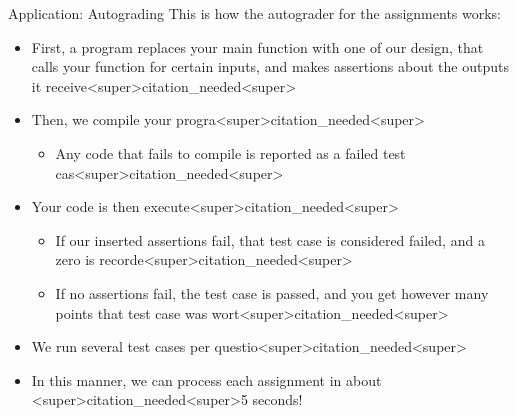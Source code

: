 \documentclass[11pt]{beamer}
\begin{document}
\begin{frame}{Application: Autograding}
This is how the autograder for the assignments works:
\begin{itemize}
\item First, a program replaces your main function with one of our design, that calls your function for certain inputs, and makes assertions about the outputs it receive<super>citation_needed<super>  
\item Then, we compile your progra<super>citation_needed<super>  
\begin{itemize}
\item Any code that fails to compile is reported as a failed test cas<super>citation_needed<super>
\end{itemize}
\item Your code is then execute<super>citation_needed<super>  
\begin{itemize}
\item If our inserted assertions fail, that test case is considered failed, and a zero is recorde<super>citation_needed<super>
\end{itemize}
\begin{itemize}
\item If no assertions fail, the test case is passed, and you get however many points that test case was wort<super>citation_needed<super>
\end{itemize}
\item We run several test cases per questio<super>citation_needed<super>  
\item In this manner, we can process each assignment in about <super>citation_needed<super>5 seconds!
\end{itemize}
\end{frame}
\end{document}
